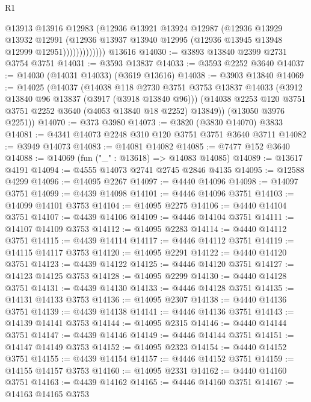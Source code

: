 \begin{lexlean}{R1}
\begin{coremodule}
                      @13913
                      @13916
                      @12983
                      (@12936
                        @13921
                        @13924
                        @12987
                        (@12936
                          @13929
                          @13932
                          @12991
                          (@12936
                            @13937
                            @13940
                            @12995
                            (@12936 @13945 @13948 @12999 @12951)))))))))))))
    @13616
@14030 := @3893 @13840 @2399 @2731 @3754 @3751
@14031 := @3593 @13837
@14033 := @3593 @2252 @3640
@14037 := @14030 (@14031 @14033) (@3619 @13616)
@14038 := @3903 @13840
@14069 := @14025
    (@14037
      (@14038
        @118
        @2730
        @3751
        @3753
        @13837
        @14033
        (@3912 @13840 @96 @13837 (@3917 (@3918 @13840 @96)))
        (@14038 @2253 @120 @3751 @3751 @2252 @3640 (@4053 @13840 @18 @2252) @13849))
      (@13050 @3976 @2251))
@14070 := @373 @3980
@14073 := @3820 (@3830 @14070) @3833
@14081 := @4341 @14073 @2248 @310 @120 @3751 @3751 @3640 @3711
@14082 := @3949 @14073
@14083 := @14081 @14082
@14085 := @7477 @152 @3640
@14088 := @14069 (fun ("_" : @13618) => @14083 @14085)
@14089 := @13617 @4191
@14094 := @4555 @14073 @2741 @2745 @2846 @4135
@14095 := @12588 @4299
@14096 := @14095 @2267
@14097 := @4440 @14096
@14098 := @14097 @3751
@14099 := @4439 @14098
@14101 := @4446 @14096 @3751
@14103 := @14099 @14101 @3753
@14104 := @14095 @2275
@14106 := @4440 @14104 @3751
@14107 := @4439 @14106
@14109 := @4446 @14104 @3751
@14111 := @14107 @14109 @3753
@14112 := @14095 @2283
@14114 := @4440 @14112 @3751
@14115 := @4439 @14114
@14117 := @4446 @14112 @3751
@14119 := @14115 @14117 @3753
@14120 := @14095 @2291
@14122 := @4440 @14120 @3751
@14123 := @4439 @14122
@14125 := @4446 @14120 @3751
@14127 := @14123 @14125 @3753
@14128 := @14095 @2299
@14130 := @4440 @14128 @3751
@14131 := @4439 @14130
@14133 := @4446 @14128 @3751
@14135 := @14131 @14133 @3753
@14136 := @14095 @2307
@14138 := @4440 @14136 @3751
@14139 := @4439 @14138
@14141 := @4446 @14136 @3751
@14143 := @14139 @14141 @3753
@14144 := @14095 @2315
@14146 := @4440 @14144 @3751
@14147 := @4439 @14146
@14149 := @4446 @14144 @3751
@14151 := @14147 @14149 @3753
@14152 := @14095 @2323
@14154 := @4440 @14152 @3751
@14155 := @4439 @14154
@14157 := @4446 @14152 @3751
@14159 := @14155 @14157 @3753
@14160 := @14095 @2331
@14162 := @4440 @14160 @3751
@14163 := @4439 @14162
@14165 := @4446 @14160 @3751
@14167 := @14163 @14165 @3753

\end{coremodule}
\end{lexlean}
